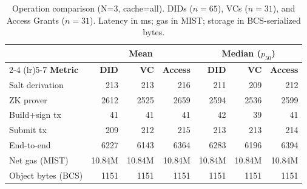 \begin{table}[t]
  \centering
  \caption{Operation comparison (N=3, cache=all). DIDs ($n=65$),
    VCs ($n=31$), and Access Grants ($n=31$).
    Latency in ms; gas in MIST; storage in BCS-serialized bytes.}
  \label{tab:op_comparison}
  \footnotesize
  \setlength{\tabcolsep}{4pt}
  \begin{tabular}{l rrr rrr}
    \toprule
    & \multicolumn{3}{c}{\textbf{Mean}} & \multicolumn{3}{c}{\textbf{Median ($p_{50}$)}} \\
    \cmidrule(lr){2-4} \cmidrule(lr){5-7}
    \textbf{Metric} & \textbf{DID} & \textbf{VC} & \textbf{Access}
                     & \textbf{DID} & \textbf{VC} & \textbf{Access} \\
    \midrule
  Salt derivation & 213 & 213 & 216 & 211 & 209 & 212 \\
  ZK prover & 2612 & 2525 & 2659 & 2594 & 2536 & 2599 \\
  Build+sign tx & 41 & 41 & 41 & 42 & 39 & 41 \\
  Submit tx & 209 & 212 & 215 & 213 & 213 & 214 \\
  End-to-end & 6227 & 6143 & 6364 & 6283 & 6196 & 6394 \\
  Net gas (MIST) & 10.84M & 10.84M & 10.84M & 10.84M & 10.84M & 10.84M \\
  Object bytes (BCS) & 1151 & 1151 & 1151 & 1151 & 1151 & 1151 \\
    \bottomrule
  \end{tabular}
\end{table}
